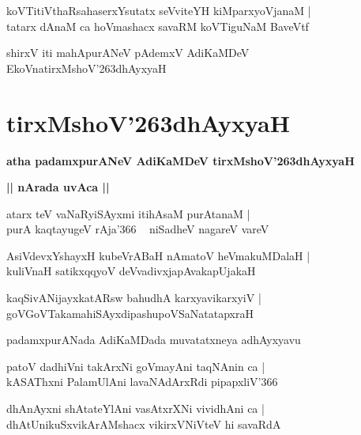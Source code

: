 \documentclass[twoside,12pt,openright]{book}
\def\S{\char'263}
\newcounter{shloka}[chapter]
\def\uvaca#1{\centerline{{\large\textbf{#1}}}}
\begin{document}
\begin{shloka}
koVTitiVthaRsahaserxYsutatx seVviteYH kiMparxyoVjanaM |\\
tatarx dAnaM ca hoVmashacx savaRM koVTiguNaM BaveVtf
\end{shloka}

\begin{center}
shirxV iti mahApurANeV pAdemxV AdiKaMDeV EkoVnatirxMshoV\S dhAyxyaH
\end{center}

\chapter{tirxMshoV\S dhAyxyaH}

\begin{center}
{\LARGE\bfseries atha padamxpurANeV AdiKaMDeV tirxMshoV\S dhAyxyaH}
\end{center}

\uvaca{|| nArada uvAca ||}

\begin{shloka}
atarx teV vaNaRyiSAyxmi itihAsaM purAtanaM |\\
purA kaqtayugeV rAja\char'366 ~ niSadheV nagareV vareV 
\end{shloka}

\begin{shloka}
AsiVdevxYshayxH kubeVrABaH nAmatoV heVmakuMDalaH |\\
kuliVnaH satikxqqyoV  deVvadivxjapAvakapUjakaH 
\end{shloka}

\begin{shloka}
kaqSivANijayxkatARsw bahudhA karxyavikarxyiV |\\
goVGoVTakamahiSAyxdipashupoVSaNatatapxraH 
\end{shloka}

\begin{center}
padamxpurANada AdiKaMDada muvatatxneya adhAyxyavu
\end{center}

\begin{shloka}
patoV dadhiVni takArxNi goVmayAni taqNAnin ca |\\
kASAThxni PalamUlAni lavaNAdArxRdi pipapxliV\char'366
\end{shloka}

\begin{shloka}
dhAnAyxni shAtateYlAni vasAtxrXNi vividhAni ca |\\
dhAtUnikuSxvikArAMshacx vikirxVNiVteV hi savaRdA 
\end{shloka}
\end{document}
